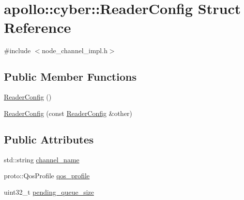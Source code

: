 \hypertarget{structapollo_1_1cyber_1_1ReaderConfig}{\section{apollo\-:\-:cyber\-:\-:Reader\-Config Struct Reference}
\label{structapollo_1_1cyber_1_1ReaderConfig}
}


{\ttfamily \#include $<$node\-\_\-channel\-\_\-impl.\-h$>$}

\subsection*{Public Member Functions}
\begin{DoxyCompactItemize}
\item 
\hyperlink{structapollo_1_1cyber_1_1ReaderConfig_aeba0186e348e190f4749430b9bbc9d96}{Reader\-Config} ()
\item 
\hyperlink{structapollo_1_1cyber_1_1ReaderConfig_aaa1830dccef81c6ee40a48c8ff2d1129}{Reader\-Config} (const \hyperlink{structapollo_1_1cyber_1_1ReaderConfig}{Reader\-Config} \&other)
\end{DoxyCompactItemize}
\subsection*{Public Attributes}
\begin{DoxyCompactItemize}
\item 
std\-::string \hyperlink{structapollo_1_1cyber_1_1ReaderConfig_aaffc3b9efdd953a4fad71e9709a1e79b}{channel\-\_\-name}
\item 
proto\-::\-Qos\-Profile \hyperlink{structapollo_1_1cyber_1_1ReaderConfig_a8cf1a58770f0b0abef6a2f3d33b2778c}{qos\-\_\-profile}
\item 
uint32\-\_\-t \hyperlink{structapollo_1_1cyber_1_1ReaderConfig_affa7656a5714023523d0f9202d0d0f2b}{pending\-\_\-queue\-\_\-size}
\end{DoxyCompactItemize}


